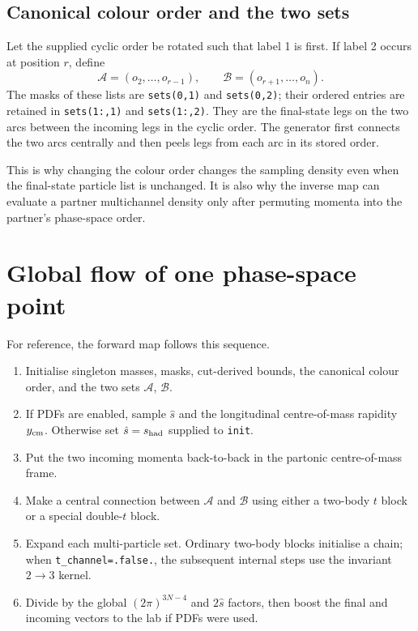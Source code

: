 \documentclass[11pt,a4paper]{article}
\newcommand{\shat}{\hat{s}}
\newcommand{\code}[1]{\texttt{#1}}
\newcommand{\mc}[1]{\mathcal{#1}}
\begin{document}
\subsection{Canonical colour order and the two sets}

Let the supplied cyclic order be rotated such that label 1 is first.  If label
2 occurs at position $r$, define
\begin{equation}
 \mc A=(o_2,\ldots,o_{r-1}),\qquad
 \mc B=(o_{r+1},\ldots,o_n).
 \label{eq:sets}
\end{equation}
The masks of these lists are \code{sets(0,1)} and \code{sets(0,2)}; their
ordered entries are retained in \code{sets(1:,1)} and \code{sets(1:,2)}.
They are the final-state legs on the two arcs between the incoming legs in the
cyclic order.  The generator first connects the two arcs centrally and then
peels legs from each arc in its stored order.

This is why changing the colour order changes the sampling density even when
the final-state particle list is unchanged.  It is also why the inverse map
can evaluate a partner multichannel density only after permuting momenta into
the partner's phase-space order.

\section{Global flow of one phase-space point}

For reference, the forward map follows this sequence.

\begin{enumerate}
\item Initialise singleton masses, masks, cut-derived bounds, the canonical
  colour order, and the two sets $\mc A$, $\mc B$.
\item If PDFs are enabled, sample $\shat$ and the longitudinal centre-of-mass
  rapidity $y_{\rm cm}$.  Otherwise set $\shat=s_{\rm had}$ supplied to
  \code{init}.
\item Put the two incoming momenta back-to-back in the partonic centre-of-mass
  frame.
\item Make a central connection between $\mc A$ and $\mc B$ using either a
  two-body $t$ block or a special double-$t$ block.
\item Expand each multi-particle set.  Ordinary two-body blocks initialise a
  chain; when \code{t\_channel=.false.}, the subsequent internal steps use the
  invariant $2\to3$ kernel.
\item Divide by the global $(2\pi)^{3N-4}$ and $2\shat$ factors, then boost
  the final and incoming vectors to the lab if PDFs were used.
\end{enumerate}
\end{document}
